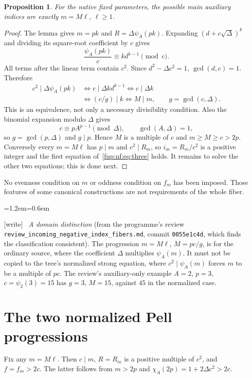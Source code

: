 \documentclass[11pt,letterpaper]{article}
\newtheorem{proposition}[theorem]{Proposition}
\theoremstyle{definition}\newtheorem{definition}[theorem]{Definition}
\theoremstyle{remark}\newtheorem{remark}[theorem]{Remark}
\newcommand{\wtag}{\textup{[write]}}
\newenvironment{writenote}{\par\smallskip\begin{list}{}{\leftmargin=1.2em\rightmargin=0.6em}\item[]\small\wtag\ }{\end{list}\smallskip}
\newcommand{\rw}[1]{\nolinkurl{#1}}%
\begin{document}
\begin{proposition}\label{fup:nf:prop:m}
For the native fixed parameters, the possible main auxiliary indices are exactly $m=M\ell$, $\ell\ge1$.
\end{proposition}
\begin{proof}
The lemma gives $m=pk$ and $R=\Delta\psi_A(pk)$. Expanding $(d+c\sqrt\Delta)^k$ and dividing its square-root coefficient by $c$ gives
\[
 \frac{\psi_A(pk)}c\equiv k d^{k-1}\pmod c.
\]
All terms after the linear term contain $c^2$. Since $d^2-\Delta c^2=1$, $\gcd(d,c)=1$. Therefore
\begin{align*}
 c^2\mid\Delta\psi_A(pk)
 &\iff c\mid\Delta k d^{k-1}
 \iff c\mid\Delta k\\
 &\iff (c/g)\mid k
 \iff M\mid m,
 \qquad g=\gcd(c,\Delta).
\end{align*}
This is an equivalence, not only a necessary divisibility condition. Also the binomial expansion modulo $\Delta$ gives
\[
 c\equiv pA^{p-1}\pmod\Delta,
 \qquad\gcd(A,\Delta)=1,
\]
so $g=\gcd(p,\Delta)$ and $g\mid p$. Hence $M$ is a multiple of $c$ and $m\ge M\ge c>2p$. Conversely every $m=M\ell$ has $p\mid m$ and $c^2\mid R_m$, so $i_m=R_m/c^2$ is a positive integer and the first equation of~\eqref{fup:nf:eq:three} holds. It remains to solve the other two equations; this is done next.
\end{proof}
No evenness condition on $m$ or oddness condition on $f_m$ has been imposed. Those features of some canonical constructions are not requirements of the whole fiber.
\begin{writenote}
\emph{A domain distinction} (from the programme's review \rw{review_incoming_negative_index_fibers.md}, commit \texttt{0055e1c4d}, which finds the classification consistent). The progression $m=M\ell$, $M=pc/g$, is for the ordinary source, where the coefficient $\Delta$ multiplies $\psi_A(m)$. It must not be copied to the tree's normalized strong equation, where $c^2\mid\psi_A(m)$ forces $m$ to be a multiple of $pc$. The review's auxiliary-only example $A=2$, $p=3$, $c=\psi_2(3)=15$ has $g=3$, $M=15$, against $45$ in the normalized case.
\end{writenote}

\section{The two normalized Pell progressions}\label{fup:nf:sec:normalized}
Fix any $m=M\ell$. Then $c\mid m$, $R=R_m$ is a positive multiple of $c^2$, and $f=f_m>2c$. The latter follows from $m>2p$ and
$\chi_A(2p)=1+2\Delta c^2>2c$.
\end{document}
